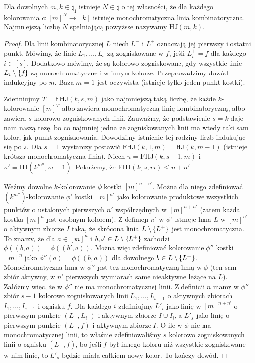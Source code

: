 \begin{theorem}
	Dla dowolnych \(m, k \in \natural_1\) istnieje \(N \in \natural\) o tej własności, że
	dla każdego kolorowania \(c: {[m]}^N \to [k]\) istnieje monochromatyczna linia kombinatoryczna.
	Najmniejszą liczbę \(N\) spełniającą powyższe nazywamy \(\text{HJ}(m, k)\).
\end{theorem}
\begin{proof}
	Dla linii kombinatorycznej \(L\) niech \(L^-\) i \(L^+\) oznaczają jej pierwszy i ostatni punkt. Mówimy, że linie \(L_1,\ldots, L_s\) zą zogniskowane w \(f\), jeśli \(L^+_i = f\) dla każdego \(i\in[s]\).
	Dodatkowo mówimy, że są kolorowo zogniskowane, gdy wszystkie linie \(L_i\setminus\set{f}\) są monochromatyczne i w innym kolorze.
	Przeprowadzimy dowód indukcyjny po \(m\). Baza \(m=1\) jest oczywista (istnieje tylko jeden punkt kostki).

	Zdefiniujmy \(T = \text{FHJ}(k,s,m)\) jako najmniejszą taką liczbę, że każde \(k\)-kolorowanie \([m]^T\) albo zawiera monochromatyczną linię kombinatoryczną, albo zawiera \(s\) kolorowo zogniskowanych linii.
	Zauważmy, że podstawienie \(s=k\) daje nam naszą tezę, bo co najmniej jedna ze zogniskowanych linii ma wtedy taki sam kolor, jak punkt zogniskowania.
	Dowodzimy istnienie tej rodziny liczb indukując się po \(s\). Dla \(s=1\) wystarczy postawić \(\text{FHJ}(k,1,m) = \text{HJ}(k,m-1)\) (istnieje krótsza monochromatyczna linia).
	Niech \(n = \text{FHJ}(k,s-1,m)\) i \(n' = \text{HJ}(k^{m^n},m-1)\). Pokażemy, że \(\text{FHJ}(k,s,m) \le n+n'\).

	Weźmy dowolne \(k\)-kolorowanie \(\phi\) kostki \([m]^{n+n'}\). Można dla niego zdefiniować \((k^{m^n})\)-kolorowanie \(\phi'\)
	kostki \([m]^{n'}\) jako kolorowanie produktowe wszystkich punktów o ustalonych pierwszych \(n'\) współrzędnych w \([m]^{n+n'}\)
	(zatem każda kostka \([m]^n\) jest osobnym kolorem). Z definicji \(n'\) w \(\phi'\) istnieje linia \(L\) w \([m]^{n'}\) o aktywnym
	zbiorze \(I\) taka, że skrócona linia \(L\setminus\set{L^+}\) jest monochromatyczna. To znaczy, że dla \(a\in[m]^n\)
	i \(b,b'\in L\setminus\set{L^+}\) zachodzi \(\phi((b,a)) = \phi((b',a))\). Można więc zdefiniować kolorowanie
	\(\phi''\) kostki \([m]^n\) jako \(\phi''(a) = \phi((b,a))\) dla dowolnego \(b\in L\setminus\set{L^+}\).
	Monochromatyczna linia w \(\phi''\) jest też monochromatyczną linią w \(\phi\) (ten sam zbiór aktywny, w \(n'\) pierwszych wymiarach same nieaktywne leżące na \(L\)).
	Załóżmy więc, że w \(\phi''\) nie ma monochromatycznej linii. Z definicji \(n\) mamy w \(\phi''\) zbiór \(s-1\) kolorowo zogniskowanych linii
	\(L_1,\ldots,L_{s-1}\) o aktywnych zbiorach \(I_1,\ldots,I_{s-1}\) i ognisku \(f\). Dla każdego \(i\) zdefiniujmy \(L'_i\) jako linię w
	\([m]^{n+n'}\) o pierwszym punkcie \((L^-,L_i^-)\) i aktywnym zbiorze \(I\cup I_i\), a \(L'_s\) jako linię o pierwszym punkcie \((L^-,f)\)
	i aktywnym zbiorze \(I\). O ile w \(\phi\) nie ma monochromatycznej linii, to właśnie zdefiniowaliśmy \(s\) kolorowo zogniskowanych linii
	o ognisku \((L^+,f)\), bo jeśli \(f\) był innego koloru niż wszystkie zogniskowane w nim linie, to \(L'_s\) będzie miała całkiem nowy kolor.
	To kończy dowód.
\end{proof}

